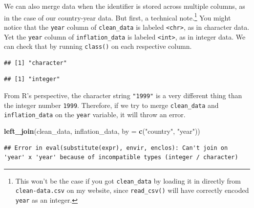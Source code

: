 \documentclass[12pt,oneside,openany]{book}
\newenvironment{Shaded}{\begin{snugshade}}{\end{snugshade}}
\newcommand{\KeywordTok}[1]{\textcolor[rgb]{0.13,0.29,0.53}{\textbf{{#1}}}}
\newcommand{\DataTypeTok}[1]{\textcolor[rgb]{0.13,0.29,0.53}{{#1}}}
\newcommand{\StringTok}[1]{\textcolor[rgb]{0.31,0.60,0.02}{{#1}}}
\newcommand{\NormalTok}[1]{{#1}}
\let\rmarkdownfootnote\footnote%
\def\footnote{\protect\rmarkdownfootnote}
\begin{document}
We can also merge data when the identifier is stored across multiple
columns, as in the case of our country-year data. But first, a technical
note.\footnote{This won't be the case if you got \texttt{clean\_data} by
  loading it in directly from \texttt{clean-data.csv} on my website,
  since \texttt{read\_csv()} will have correctly encoded \texttt{year}
  as an integer.} You might notice that the \texttt{year} column of
\texttt{clean\_data} is labeled \texttt{\textless{}chr\textgreater{}},
as in character data. Yet the \texttt{year} column of
\texttt{inflation\_data} is labeled
\texttt{\textless{}int\textgreater{}}, as in integer data. We can check
that by running \texttt{class()} on each respective column.

\begin{Shaded}
\end{Shaded}

\begin{verbatim}
## [1] "character"
\end{verbatim}

\begin{Shaded}
\end{Shaded}

\begin{verbatim}
## [1] "integer"
\end{verbatim}

From R's perspective, the character string \texttt{"1999"} is a very
different thing than the integer number \texttt{1999}. Therefore, if we
try to merge \texttt{clean\_data} and \texttt{inflation\_data} on the
\texttt{year} variable, it will throw an error.

\begin{Shaded}
\begin{Highlighting}[]
\KeywordTok{left_join}\NormalTok{(clean_data,}
          \NormalTok{inflation_data,}
          \DataTypeTok{by =} \KeywordTok{c}\NormalTok{(}\StringTok{"country"}\NormalTok{, }\StringTok{"year"}\NormalTok{))}
\end{Highlighting}
\end{Shaded}

\begin{verbatim}
## Error in eval(substitute(expr), envir, enclos): Can't join on 'year' x 'year' because of incompatible types (integer / character)
\end{verbatim}
\end{document}
